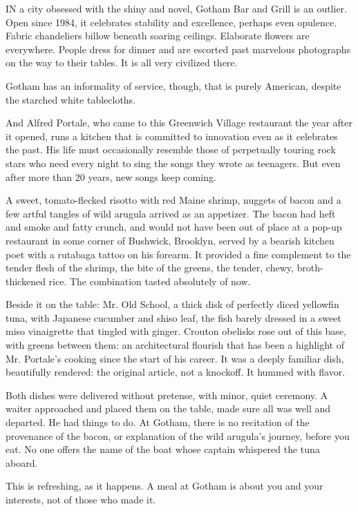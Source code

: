 IN a city obsessed with the shiny and novel, Gotham Bar and Grill is an
outlier. Open since 1984, it celebrates stability and excellence,
perhaps even opulence. Fabric chandeliers billow beneath soaring
ceilings. Elaborate flowers are everywhere. People dress for dinner and
are escorted past marvelous photographs on the way to their tables. It
is all very civilized there.

Gotham has an informality of service, though, that is purely American,
despite the starched white tablecloths.

And Alfred Portale, who came to this Greenwich Village restaurant the
year after it opened, runs a kitchen that is committed to innovation
even as it celebrates the past. His life must occasionally resemble
those of perpetually touring rock stars who need every night to sing the
songs they wrote as teenagers. But even after more than 20 years, new
songs keep coming.

A sweet, tomato-flecked risotto with red Maine shrimp, nuggets of bacon
and a few artful tangles of wild arugula arrived as an appetizer. The
bacon had heft and smoke and fatty crunch, and would not have been out
of place at a pop-up restaurant in some corner of Bushwick, Brooklyn,
served by a bearish kitchen poet with a rutabaga tattoo on his forearm.
It provided a fine complement to the tender flesh of the shrimp, the
bite of the greens, the tender, chewy, broth-thickened rice. The
combination tasted absolutely of now.

Beside it on the table: Mr. Old School, a thick disk of perfectly diced
yellowfin tuna, with Japanese cucumber and shiso leaf, the fish barely
dressed in a sweet miso vinaigrette that tingled with ginger. Crouton
obelisks rose out of this base, with greens between them: an
architectural flourish that has been a highlight of Mr. Portale's
cooking since the start of his career. It was a deeply familiar dish,
beautifully rendered: the original article, not a knockoff. It hummed
with flavor.

Both dishes were delivered without pretense, with minor, quiet ceremony.
A waiter approached and placed them on the table, made sure all was well
and departed. He had things to do. At Gotham, there is no recitation of
the provenance of the bacon, or explanation of the wild arugula's
journey, before you eat. No one offers the name of the boat whose
captain whispered the tuna aboard.

This is refreshing, as it happens. A meal at Gotham is about you and
your interests, not of those who made it.

